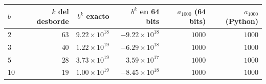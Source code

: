 \begin{tabular}{lrrrrr}
\toprule
$b$ & $k$ del desborde & $b^k$ exacto & $b^k$ en 64 bits & $a_{1000}$ (64 bits) & $a_{1000}$ (Python) \\
\midrule
$2$ & $63$ & $9.22 \times 10^{18}$ & $-9.22 \times 10^{18}$ & $1000$ & $1000$ \\
$3$ & $40$ & $1.22 \times 10^{19}$ & $-6.29 \times 10^{18}$ & $1000$ & $1000$ \\
$5$ & $28$ & $3.73 \times 10^{19}$ & $3.59 \times 10^{17}$ & $1000$ & $1000$ \\
$10$ & $19$ & $1.00 \times 10^{19}$ & $-8.45 \times 10^{18}$ & $1000$ & $1000$ \\
\bottomrule
\end{tabular}
